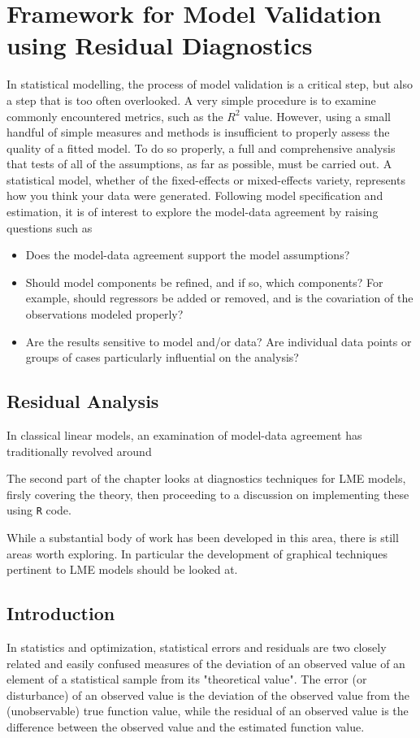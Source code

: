 \documentclass[Main.tex]{subfiles}
\begin{document}
\section{Framework for Model Validation using Residual Diagnostics}
In statistical modelling, the process of model validation is a critical step, but also a step that is too often overlooked. A very simple procedure is to examine commonly encountered
metrics, such as the $R^2$ value. However, using a small handful of simple measures and methods is insufficient to properly assess the quality of a fitted model. To do so properly, a full and comprehensive
analysis that tests of all of the assumptions, as far as possible, must be carried out. A statistical model, whether of the fixed-effects or mixed-effects variety, represents how you think your data
were generated. Following model specification and estimation, it is of interest to explore the model-data
agreement by raising questions such as
\begin{itemize}
	\item Does the model-data agreement support the model assumptions?
	\item Should model components be refined, and if so, which components? For example, should regressors
	be added or removed, and is the covariation of the observations modeled properly?
	\item Are the results sensitive to model and/or data? Are individual data points or groups of cases particularly
	influential on the analysis?
\end{itemize}


\subsection{Residual Analysis}

In classical linear models, an examination of model-data agreement has traditionally revolved around

The second part of the chapter looks at diagnostics techniques for LME models, firsly covering the theory, then proceeding to a discussion on 
implementing these using \texttt{R} code.

While a substantial body of work has been developed in this area, there is still areas worth exploring. 
In particular the development of graphical techniques pertinent to LME models should be looked at.

	

\subsection{Introduction}
In statistics and optimization, statistical errors and residuals are two closely related and easily confused measures of the deviation of an observed value of an element of a statistical sample from its "theoretical value". The error (or disturbance) of an observed value is the deviation of the observed value from the (unobservable) true function value, while the residual of an observed value is the difference between the observed value and the estimated function value.
\end{document}
